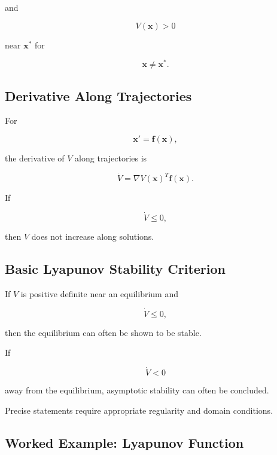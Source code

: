 and

\[
\boxed{
V(\mathbf{x})>0
}
\]

near \(\mathbf{x}^*\) for

\[
\mathbf{x}\neq\mathbf{x}^*.
\]

\subsection{Derivative Along Trajectories}
\label{subsec:lyapunov-derivative}

For

\[
\mathbf{x}'
=
\mathbf{f}(\mathbf{x}),
\]

the derivative of \(V\) along trajectories is

\[
\boxed{
\dot V
=
\nabla V(\mathbf{x})^T
\mathbf{f}(\mathbf{x}).
}
\]

If

\[
\dot V\leq0,
\]

then \(V\) does not increase along solutions.

\subsection{Basic Lyapunov Stability Criterion}
\label{subsec:basic-lyapunov-criterion}

If \(V\) is positive definite near an equilibrium and

\[
\boxed{
\dot V\leq0,
}
\]

then the equilibrium can often be shown to be stable.

If

\[
\boxed{
\dot V<0
}
\]

away from the equilibrium, asymptotic stability can often be concluded.

Precise statements require appropriate regularity and domain conditions.

\subsection{Worked Example: Lyapunov Function}
\label{subsec:worked-lyapunov}

